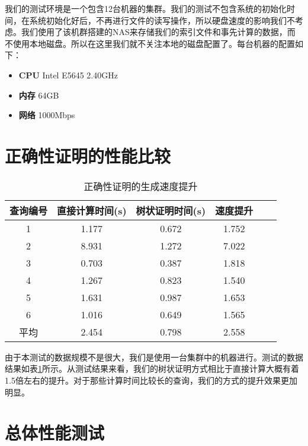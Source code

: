 我们的测试环境是一个包含12台机器的集群。我们的测试不包含系统的初始化时间，在系统初始化好后，不再进行文件的读写操作，所以硬盘速度的影响我们不考虑。我们使用了该机群搭建的NAS来存储我们的索引文件和事先计算的数据，而不使用本地磁盘。所以在这里我们就不关注本地的磁盘配置了。每台机器的配置如下：

\begin{itemize}
    \item \textbf{CPU} Intel E5645 2.40GHz
    \item \textbf{内存} 64GB
    \item \textbf{网络} 1000Mbps
\end{itemize}

\section {正确性证明的性能比较}
\begin{table}[!tb]
    \centering
    \caption{\textsc{正确性证明的生成速度提升}}
    \begin{tabular}{cccccc}
        \toprule
        查询编号 & 直接计算时间(s) & 树状证明时间(s) & 速度提升 \\
        \midrule
        1 & 1.177 & 0.672 & 1.752  \\
        2 & 8.931 & 1.272 & 7.022  \\
        3 & 0.703 & 0.387 & 1.818  \\
        4 & 1.267 & 0.823 & 1.540  \\
        5 & 1.631 & 0.987 & 1.653  \\
        6 & 1.016 & 0.649 & 1.565  \\
        \midrule
        平均 & 2.454 & 0.798 & 2.558  \\
        \bottomrule
    \end{tabular}
    \label{tab:correctness_speedup}
\end{table}

由于本测试的数据规模不是很大，我们是使用一台集群中的机器进行。测试的数据结果如表\ref{tab:correctness_speedup}所示。从测试结果来看，我们的树状证明方式相比于直接计算大概有着1.5倍左右的提升。对于那些计算时间比较长的查询，我们的方式的提升效果更加明显。

\section {总体性能测试}

